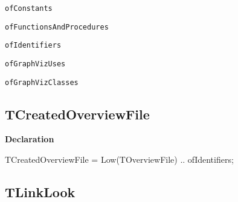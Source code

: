 \documentclass{report}
\newif\ifpdf
\begin{document}
\begin{list}{}
\begin{description}
\item[\texttt{ofConstants}] \label{PasDoc_Gen-ofConstants}
\index{}
 
\item[\texttt{ofFunctionsAndProcedures}] \label{PasDoc_Gen-ofFunctionsAndProcedures}
\index{}
 
\item[\texttt{ofIdentifiers}] \label{PasDoc_Gen-ofIdentifiers}
\index{}
 
\item[\texttt{ofGraphVizUses}] \label{PasDoc_Gen-ofGraphVizUses}
\index{}
 
\item[\texttt{ofGraphVizClasses}] \label{PasDoc_Gen-ofGraphVizClasses}
\index{}
 
\end{description}


\end{list}
\ifpdf
\subsection*{\large{\textbf{TCreatedOverviewFile}}\normalsize\hspace{1ex}\hrulefill}
\else
\subsection*{TCreatedOverviewFile}
\fi
\label{PasDoc_Gen-TCreatedOverviewFile}
\begin{list}{}{
\setlength{\itemindent}{0cm}
\setlength{\listparindent}{0cm}
\setlength{\leftmargin}{\evensidemargin}
\addtolength{\leftmargin}{\tmplength}
\settowidth{\labelsep}{X}
\addtolength{\leftmargin}{\labelsep}
\setlength{\labelwidth}{\tmplength}
}
\item[\textbf{Declaration}\hfill]
\ifpdf
\begin{flushleft}
\fi
\begin{ttfamily}
TCreatedOverviewFile = Low(TOverviewFile) .. ofIdentifiers;\end{ttfamily}

\ifpdf
\end{flushleft}
\fi

\end{list}
\ifpdf
\subsection*{\large{\textbf{TLinkLook}}\normalsize\hspace{1ex}\hrulefill}
\else
\end{document}
